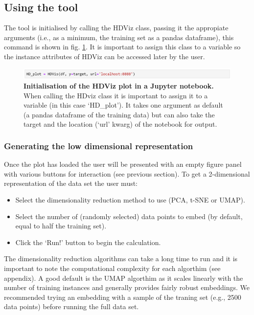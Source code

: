 \documentclass[11pt]{article} %
\begin{document}
\subsection{Using the tool}

The tool is initialised by calling the HDViz class, passing it the appropiate arguments (i.e., as a minimum, the training set as a pandas dataframe), this command is shown in fig. \ref{fig:HDViz_init}. It is important to assign this class to a variable so the instance attributes of HDViz can be accessed later by the user.

\begin{figure}[!h]
\centering
\includegraphics[width=5.75in]{images/HDViz_intialisation.png}
\caption{\textbf{Initialisation of the HDViz plot in a Jupyter notebook.} When calling the HDviz class it is important to assign it to a variable (in this case `HD\_plot'). It takes one argument as default (a pandas dataframe of the training data) but can also take the target and the location (`url' kwarg) of the notebook for output.}
\label{fig:HDViz_init}
\end{figure}

\subsubsection{Generating the low dimensional representation}

Once the plot has loaded the user will be presented with an empty figure panel with various buttons for interaction (see previous section).  To get a 2-dimensional representation of the data set the user must:

\begin{itemize}
\item Select the dimensionality reduction method to use (PCA, t-SNE or UMAP).
\item Select the number of (randomly selected) data points to embed (by default, equal to half the training set).
\item Click the `Run!' button to begin the calculation. 
\end{itemize}

The dimensionality reduction algorithms can take a long time to run and it is important to note the computational complexity for each algorthim (see appendix). A good default is the UMAP algorthim as it scales linearly with the number of training instances and generally provides fairly robust embeddings. We recommended trying an embedding with a sample of the traning set (e.g., 2500 data points) before running the full data set.
\end{document}
